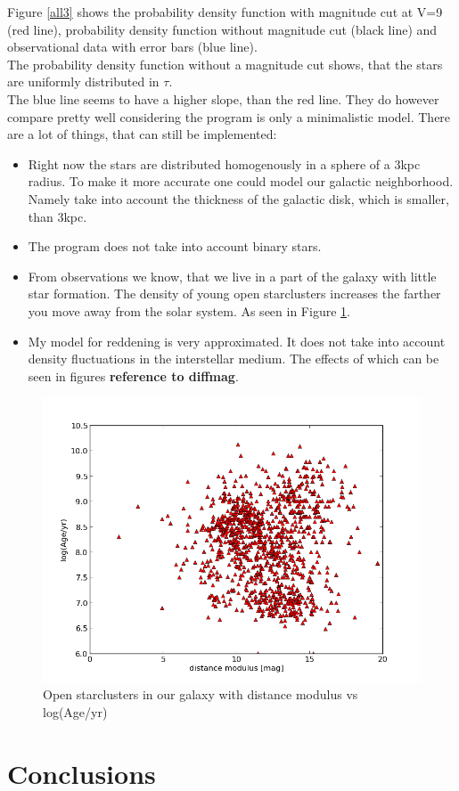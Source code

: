 \documentclass[a4paper,10pt]{article}
\begin{document}
 Figure \ref{all3} shows the probability density function with magnitude cut at V=9 (red line), probability density function without 
 magnitude cut (black line) and observational data with error bars (blue line).\\
 The probability density function without a magnitude cut shows, that the stars are uniformly distributed in $\tau$.\\
 The blue line seems to have a higher slope, than the red line. They do however compare pretty well 
 considering the program is only a minimalistic model. There are a lot of things, that can still be implemented:\\
 \begin{itemize}
  \item Right now the stars are distributed homogenously in a sphere of a 3kpc radius. To make it more accurate one could model our
  galactic neighborhood. Namely take into account the thickness of the galactic disk, which is smaller, than 3kpc.
  \item The program does not take into account binary stars. 
  \item From observations we know, that we live in a part of the galaxy with little star formation.  
  The density of young open starclusters increases the farther you move away from the solar system. As seen in Figure \ref{clusters}.
  \item My model for reddening is very approximated. It does not take into account density fluctuations in the interstellar medium. 
  The effects of which can be seen in figures \textbf{reference to diffmag}.
 \end{itemize}
 \begin{figure}[h!]
  \includegraphics[width=\textwidth]{clusters}
  \caption{Open starclusters in our galaxy with distance modulus vs log(Age/yr)  \label{clusters}}
 \end{figure}

 
 \section{Conclusions}
 
 
 
 
\end{document}
